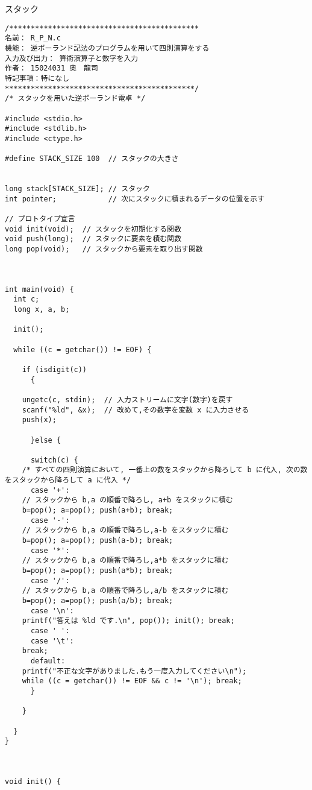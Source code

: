 \documentclass[a4j,titlepage]{jarticle}
\begin{document}
\begin{breakitembox}[l]{スタック} \small
\begin{verbatim}
/********************************************
名前： R_P_N.c
機能： 逆ポーランド記法のプログラムを用いて四則演算をする
入力及び出力： 算術演算子と数字を入力
作者： 15024031 奥　龍司
特記事項：特になし
********************************************/
/* スタックを用いた逆ポーランド電卓 */

#include <stdio.h>
#include <stdlib.h>
#include <ctype.h>

#define STACK_SIZE 100  // スタックの大きさ


long stack[STACK_SIZE]; // スタック
int pointer;            // 次にスタックに積まれるデータの位置を示す

// プロトタイプ宣言
void init(void);  // スタックを初期化する関数
void push(long);  // スタックに要素を積む関数
long pop(void);   // スタックから要素を取り出す関数



int main(void) {
  int c;
  long x, a, b;
  
  init();

  while ((c = getchar()) != EOF) {
    
    if (isdigit(c)) 
      {

	ungetc(c, stdin);  // 入力ストリームに文字(数字)を戻す
	scanf("%ld", &x);  // 改めて,その数字を変数 x に入力させる
	push(x);
	
      }else {
      
      switch(c) {
	/* すべての四則演算において, 一番上の数をスタックから降ろして b に代入, 次の数をスタックから降ろして a に代入 */
      case '+':
	// スタックから b,a の順番で降ろし, a+b をスタックに積む
	b=pop(); a=pop(); push(a+b); break;
      case '-':
	// スタックから b,a の順番で降ろし,a-b をスタックに積む
	b=pop(); a=pop(); push(a-b); break;
      case '*':
	// スタックから b,a の順番で降ろし,a*b をスタックに積む
	b=pop(); a=pop(); push(a*b); break;
      case '/':
	// スタックから b,a の順番で降ろし,a/b をスタックに積む
	b=pop(); a=pop(); push(a/b); break;
      case '\n':
	printf("答えは %ld です.\n", pop()); init(); break;
      case ' ':
      case '\t':
	break;
      default:
	printf("不正な文字がありました.もう一度入力してください\n");
	while ((c = getchar()) != EOF && c != '\n'); break;
      }
      
    }
    
  }
}



void init() {
  

\end{verbatim}
\end{breakitembox}
\end{document}
